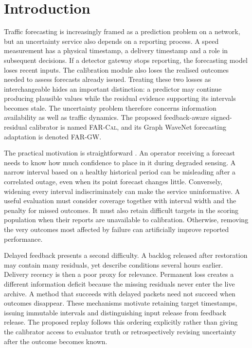 \documentclass[pdflatex,sn-mathphys-num]{sn-jnl}
\newcommand{\FAR}{\textsc{FAR-Cal}}
\begin{document}
\section{Introduction}\label{sec:introduction}
Traffic forecasting is increasingly framed as a prediction problem on a network, but an uncertainty service also depends on a reporting process. A speed measurement has a physical timestamp, a delivery timestamp and a role in subsequent decisions. If a detector gateway stops reporting, the forecasting model loses recent inputs. The calibration module also loses the realised outcomes needed to assess forecasts already issued. Treating these two losses as interchangeable hides an important distinction: a predictor may continue producing plausible values while the residual evidence supporting its intervals becomes stale. The uncertainty problem therefore concerns information availability as well as traffic dynamics. The proposed feedback-aware signed-residual calibrator is named \FAR{}, and its Graph WaveNet forecasting adaptation is denoted FAR-GW.

The practical motivation is straightforward \citep{vlahogianni2014,khosravi2011}. An operator receiving a forecast needs to know how much confidence to place in it during degraded sensing. A narrow interval based on a healthy historical period can be misleading after a correlated outage, even when its point forecast changes little. Conversely, widening every interval indiscriminately can make the service uninformative. A useful evaluation must consider coverage together with interval width and the penalty for missed outcomes. It must also retain difficult targets in the scoring population when their reports are unavailable to calibration. Otherwise, removing the very outcomes most affected by failure can artificially improve reported performance.

Delayed feedback presents a second difficulty. A backlog released after restoration may contain many residuals, yet describe conditions several hours earlier. Delivery recency is then a poor proxy for relevance. Permanent loss creates a different information deficit because the missing residuals never enter the live archive. A method that succeeds with delayed packets need not succeed when outcomes disappear. These mechanisms motivate retaining target timestamps, issuing immutable intervals and distinguishing input release from feedback release. The proposed replay follows this ordering explicitly rather than giving the calibrator access to evaluator truth or retrospectively revising uncertainty after the outcome becomes known.
\end{document}

